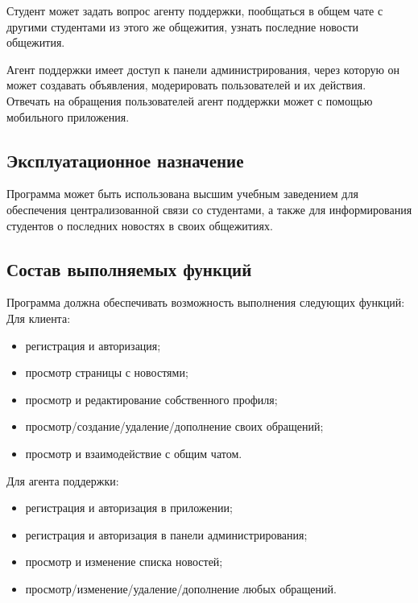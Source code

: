 \documentclass{../includes/TechDoc}
\begin{document}
    Студент может задать вопрос агенту поддержки, пообщаться в общем чате с другими
    студентами из этого же общежития, узнать последние новости общежития.

    Агент поддержки имеет доступ к панели администрирования, через которую он может создавать объявления, модерировать пользователей и их действия.
    Отвечать на обращения пользователей агент поддержки может с помощью мобильного приложения.

    \subsection{Эксплуатационное назначение}

    Программа может быть использована высшим учебным заведением для обеспечения централизованной связи со студентами, а
    также для информирования студентов о последних новостях в своих общежитиях.

    \subsection{Состав выполняемых функций}

    Программа должна обеспечивать возможность выполнения следующих функций:\\

    Для клиента:
    \begin{itemize}[noitemsep]
        \item регистрация и авторизация;
        \item просмотр страницы с новостями;
        \item просмотр и редактирование собственного профиля;
        \item просмотр/создание/удаление/дополнение своих обращений;
        \item просмотр и взаимодействие с общим чатом.
    \end{itemize}

    Для агента поддержки:
    \begin{itemize}[noitemsep]
        \item регистрация и авторизация в приложении;
        \item регистрация и авторизация в панели администрирования;
        \item просмотр и изменение списка новостей;
        \item просмотр/изменение/удаление/дополнение любых обращений.
    \end{itemize}
\end{document}
